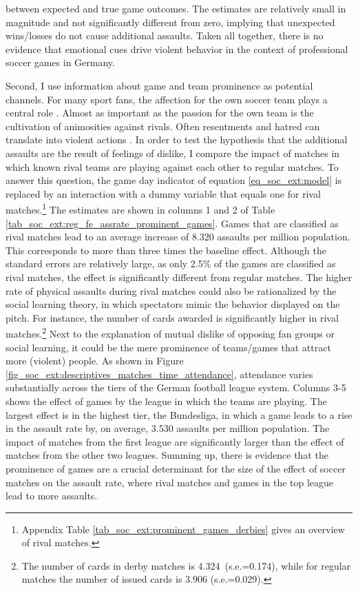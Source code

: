 \documentclass[11pt, a4paper]{article} %
\begin{document}
between expected and true game outcomes. The estimates are relatively small in magnitude and not significantly different from zero, implying that unexpected wins/losses do not cause additional assaults. Taken all together, there is no evidence that emotional cues drive violent behavior in the context of professional soccer games in Germany.



Second, I use information about game and team prominence as potential channels. For many sport fans, the affection for the own soccer team plays a central role \citep{wann1993sports}. Almost as important as the passion for the own team is the cultivation of animosities against rivals. Often resentments and hatred can translate into violent actions \citep{nassauer2011hate}. In order to test the hypothesis that the additional assaults are the result of feelings of dislike, I compare the impact of matches in which known rival teams are playing against each other to regular matches. To answer this question, the game day indicator of equation \ref{eq_soc_ext:model} is replaced by an interaction with a dummy variable that equals one for rival matches.\footnote{Appendix Table \ref{tab_soc_ext:prominent_games_derbies} gives an overview of rival matches.} The estimates are shown in columns 1 and 2 of Table \ref{tab_soc_ext:reg_fe_assrate_prominent_games}. Games that are classified as rival matches lead to an average increase of 8.320 assaults per million population. This corresponds to more than three times the baseline effect. Although the standard errors are relatively large, as only 2.5\% of the games are classified as rival matches, the effect is significantly different from regular matches. The higher rate of physical assaults during rival matches could also be rationalized by the social learning theory, in which spectators mimic the behavior displayed on the pitch. For instance, the number of cards awarded is significantly higher in rival matches.\footnote{The number of cards in derby matches is 4.324\ (s.e.=0.174), while for regular matches the number of issued cards is 3.906 (s.e.=0.029).} Next to the explanation of mutual dislike of opposing fan groups or social learning, it could be the mere prominence of teams/games that attract more (violent) people. As shown in Figure \ref{fig_soc_ext:descriptives_matches_time_attendance}, attendance varies substantially across the tiers of the German football league system. Columns 3-5 shows the effect of games by the league in which the teams are playing. The largest effect is in the highest tier, the Bundesliga, in which a game leads to a rise in the assault rate by, on average, 3.530 assaults per million population. The impact of matches from the first league are significantly larger than the effect of matches from the other two leagues.
Summing up, there is evidence that the prominence of games are a crucial determinant for the size of the effect of soccer matches on the assault rate, where rival matches and games in the top league lead to more assaults.
\end{document}
